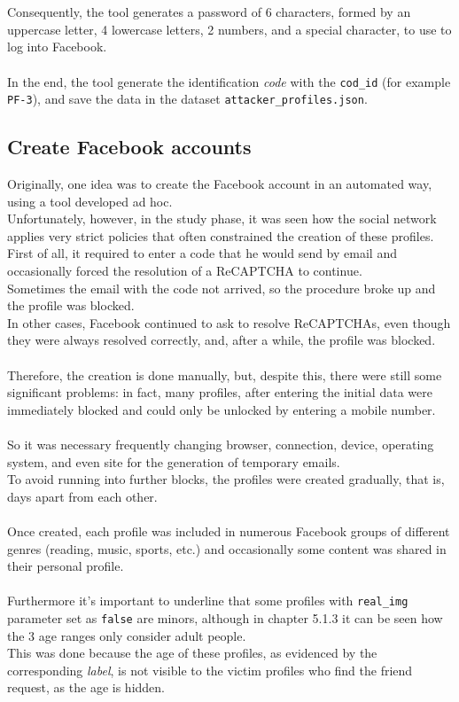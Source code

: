 \\\\Consequently, the tool generates a password of 6 characters, formed by an uppercase letter, 4 lowercase letters, 2 numbers, and a special character, to use to log into Facebook.
\\\\In the end, the tool generate the identification \textit{code} with the \texttt{cod\_id} (for example \texttt{PF-3}), and save the data in the dataset \texttt{attacker\_profiles.json}.

\subsection{Create Facebook accounts}
Originally, one idea was to create the Facebook account in an automated way, using a tool developed ad hoc.
\\Unfortunately, however, in the study phase, it was seen how the social network applies very strict policies that often constrained the creation of these profiles.
\\First of all, it required to enter a code that he would send by email and occasionally forced the resolution of a ReCAPTCHA to continue. \\Sometimes the email with the code not arrived, so the procedure broke up and the profile was blocked. 
\\In other cases, Facebook continued to ask to resolve ReCAPTCHAs, even though they were always resolved correctly, and, after a while, the profile was blocked.
\\\\Therefore, the creation is done manually, but, despite this, there were still some significant problems: in fact, many profiles, after entering the initial data were immediately blocked and could only be unlocked by entering a mobile number.
\\\\So it was necessary frequently changing browser, connection, device, operating system, and even site for the generation of temporary emails. \\To avoid running into further blocks, the profiles were created gradually, that is, days apart from each other.
\\\\Once created, each profile was included in numerous Facebook groups of different genres (reading, music, sports, etc.) and occasionally some content was shared in their personal profile.
\\\\Furthermore it's important to underline that some profiles with \texttt{real\_img} parameter set as \texttt{false} are minors, although in chapter 5.1.3 it can be seen how the 3 age ranges only consider adult people.\\This was done because the age of these profiles, as evidenced by the corresponding \textit{label}, is not visible to the victim profiles who find the friend request, as the age is hidden.
